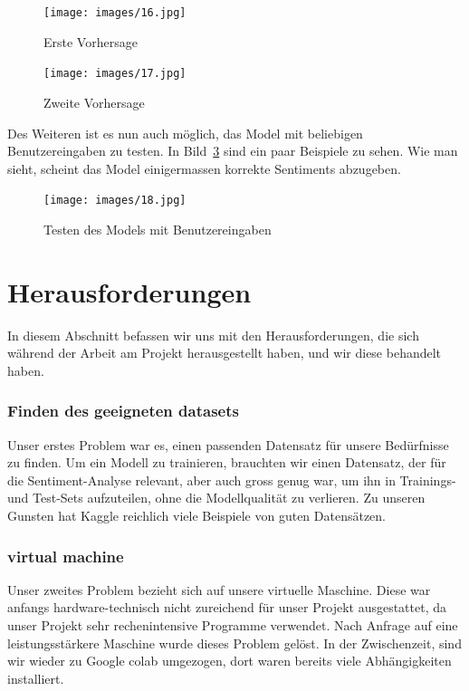 \begin{figure}[ht!]
\centering
\texttt{[image: images/16.jpg]}
\caption{Erste Vorhersage}
\label{fig:fig_14}
\end{figure}
\FloatBarrier

\begin{figure}[ht!]
\centering
\texttt{[image: images/17.jpg]}
\caption{Zweite Vorhersage}
\label{fig:fig_15}
\end{figure}
\FloatBarrier

Des Weiteren ist es nun auch möglich, das Model mit beliebigen Benutzereingaben zu testen. In Bild~\ref{fig:fig_16} sind ein paar Beispiele zu sehen. Wie man sieht, scheint das Model einigermassen korrekte Sentiments abzugeben.

\begin{figure}[ht!]
\centering
\texttt{[image: images/18.jpg]}
\caption{Testen des Models mit Benutzereingaben}
\label{fig:fig_16}
\end{figure}
\FloatBarrier

\section{Herausforderungen}
In diesem Abschnitt befassen wir uns mit den Herausforderungen, die sich während der Arbeit am Projekt herausgestellt haben, und wir diese behandelt haben.

\subsubsection*{Finden des geeigneten \gls{dataset}s} 
Unser erstes Problem war es, einen passenden Datensatz für unsere Bedürfnisse zu finden. Um ein Modell zu trainieren, brauchten wir einen Datensatz, der für die Sentiment-Analyse relevant, aber auch gross genug war, um ihn in Trainings- und Test-Sets aufzuteilen, ohne die Modellqualität zu verlieren. Zu unseren Gunsten hat Kaggle reichlich viele Beispiele von guten Datensätzen.

\subsubsection*{\gls{virtual machine}}
Unser zweites Problem bezieht sich auf unsere virtuelle Maschine. Diese war anfangs hardware-technisch nicht zureichend für unser Projekt ausgestattet, da unser Projekt sehr rechenintensive Programme verwendet. Nach Anfrage auf eine leistungsstärkere Maschine wurde dieses Problem gelöst. In der Zwischenzeit, sind wir wieder zu Google \gls{colab} umgezogen, dort waren bereits viele Abhängigkeiten installiert.

